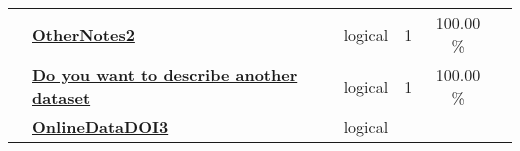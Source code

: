 \documentclass[]{article}
\begin{document}
\begin{longtable}[]{@{}lllrcl@{}}
\begin{minipage}[t]{0.07\columnwidth}
\strut
\end{minipage} & \begin{minipage}[t]{0.35\columnwidth}\raggedright\strut
\textbf{\protect\hyperlink{othernotes2}{OtherNotes2}}\strut
\end{minipage} & \begin{minipage}[t]{0.11\columnwidth}\raggedright\strut
logical\strut
\end{minipage} & \begin{minipage}[t]{0.10\columnwidth}\raggedleft\strut
1\strut
\end{minipage} & \begin{minipage}[t]{0.10\columnwidth}\centering\strut
100.00 \%\strut
\end{minipage} & \begin{minipage}[t]{0.12\columnwidth}\raggedright\strut
\strut
\end{minipage}\tabularnewline
\begin{minipage}[t]{0.07\columnwidth}\raggedright\strut
\strut
\end{minipage} & \begin{minipage}[t]{0.35\columnwidth}\raggedright\strut
\textbf{\protect\hyperlink{do-you-want-to-describe-another-dataset}{Do
you want to describe another dataset}}\strut
\end{minipage} & \begin{minipage}[t]{0.11\columnwidth}\raggedright\strut
logical\strut
\end{minipage} & \begin{minipage}[t]{0.10\columnwidth}\raggedleft\strut
1\strut
\end{minipage} & \begin{minipage}[t]{0.10\columnwidth}\centering\strut
100.00 \%\strut
\end{minipage} & \begin{minipage}[t]{0.12\columnwidth}\raggedright\strut
\strut
\end{minipage}\tabularnewline
\begin{minipage}[t]{0.07\columnwidth}\raggedright\strut
\strut
\end{minipage} & \begin{minipage}[t]{0.35\columnwidth}\raggedright\strut
\textbf{\protect\hyperlink{onlinedatadoi3}{OnlineDataDOI3}}\strut
\end{minipage} & \begin{minipage}[t]{0.11\columnwidth}\raggedright\strut
logical\strut
\end{minipage} & \begin{minipage}[t]{0.10\columnwidth}\raggedleft\strut

\end{minipage}
\end{longtable}
\end{document}

